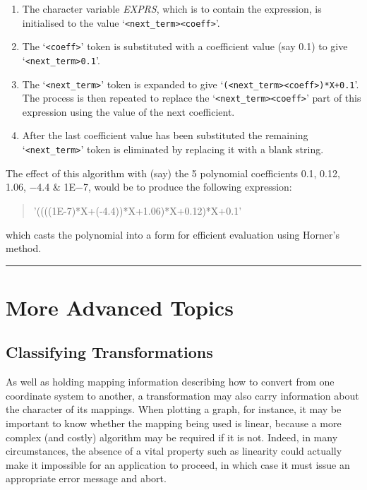 \documentclass[twoside,nolof,11pt]{starlink}
\providecommand{\fortvar}[1]{\emph{#1}}
\providecommand{\exampledone}[0]{\begin{center} \rule{6em}{0.2mm} \end{center}}
\begin{document}
\begin{enumerate}

\item The character variable \fortvar{EXPRS}, which is to contain the
expression, is initialised to the value `\verb#<next_term><coeff>#'.

\item The `\verb#<coeff>#' token is substituted with a coefficient
value (say 0.1) to give `\verb#<next_term>0.1#'.

\item The `\verb#<next_term>#' token is expanded to give
`\verb#(<next_term><coeff>)*X+0.1#'.
The process is then repeated to replace the `\verb#<next_term><coeff>#'
part of this expression using the value of the next coefficient.

\item After the last coefficient value has been substituted the remaining
`\verb#<next_term>#' token is eliminated by replacing it with a blank
string.

\end{enumerate}

The effect of this algorithm with (say) the 5 polynomial coefficients 0.1,
0.12, 1.06, $-$4.4 \& 1E$-$7, would be to produce the following expression:

\begin{quote}
\begin{terminalv}
'((((1E-7)*X+(-4.4))*X+1.06)*X+0.12)*X+0.1'
\end{terminalv}
\end{quote}

which casts the polynomial into a form for efficient evaluation using
Horner's method.
\exampledone


\section{More Advanced Topics}


\subsection{Classifying Transformations}

\label{section:advanced:classification}

As well as holding mapping information describing how to convert from one
coordinate system to another, a transformation may also carry information
about the character of its mappings.
When plotting a graph, for instance, it may be important to know whether the
mapping being used is linear, because a more complex (and costly) algorithm
may be required if it is not.
Indeed, in many circumstances, the absence of a vital property such as
linearity could actually make it impossible for an application to proceed,
in which case it must issue an appropriate error message and abort.
\end{document}
